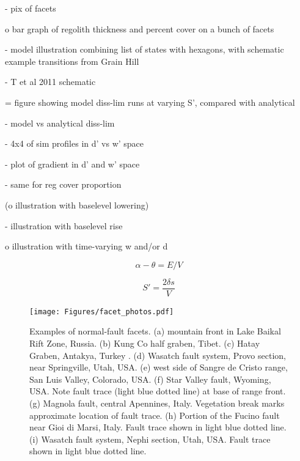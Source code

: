 - pix of facets

o bar graph of regolith thickness and percent cover on a bunch of facets

- model illustration combining list of states with hexagons, with schematic example transitions from Grain Hill

- T et al 2011 schematic

= figure showing model diss-lim runs at varying S', compared with analytical

- model vs analytical diss-lim

- 4x4 of sim profiles in d' vs w' space

- plot of gradient in d' and w' space

- same for reg cover proportion

(o illustration with baselevel lowering)

- illustration with baselevel rise

o illustration with time-varying w and/or d



\begin{equation}
\alpha - \theta = E / V
\label{eq:angdif}
\end{equation}

\begin{equation}
S' = \frac{2\delta s}{V}
\label{eq:nddissefficiency}
\end{equation}





%
%
%
%


\begin{figure}[ht!]
\centerline{\texttt{[image: Figures/facet\_photos.pdf]}}
\caption{Examples of normal-fault facets. (a) mountain front in Lake Baikal Rift Zone, Russia. (b) Kung Co half graben, Tibet. (c) Hatay Graben, Antakya, Turkey \citep{boulton2009quantifying}. (d) Wasatch fault system, Provo section, near Springville, Utah, USA. (e) west side of Sangre de Cristo range, San Luis Valley, Colorado, USA. (f) Star Valley fault, Wyoming, USA. Note fault trace (light blue dotted line) at base of range front. (g) Magnola fault, central Apennines, Italy. Vegetation break marks approximate location of fault trace. (h) Portion of the Fucino fault near Gioi di Marsi, Italy. Fault trace shown in light blue dotted line. (i) Wasatch fault system, Nephi section, Utah, USA. Fault trace shown in light blue dotted line.}
\label{fig:facets}
\end{figure}

